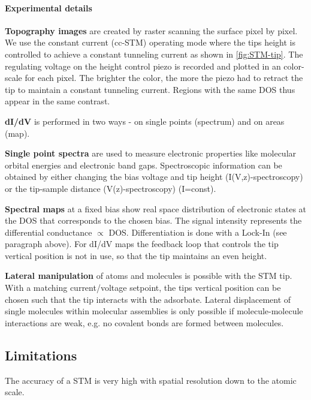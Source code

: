 \paragraph{Experimental details}

\textbf{Topography images} are created by raster scanning the surface pixel by pixel. 
We use the constant current (cc-STM) operating mode where the tips height is controlled to achieve a constant tunneling current as shown in \autoref{fig:STM-tip}. The regulating voltage on the height control piezo is recorded and plotted in an color-scale for each pixel. The brighter the color, the more the piezo had to retract the tip to maintain a constant tunneling current. Regions with the same DOS thus appear in the same contrast.


\textbf{dI/dV} is performed in two ways - on single points (spectrum) and on areas (map). 

\textbf{Single point spectra} are used to measure electronic properties like molecular orbital energies and electronic band gaps.
Spectroscopic information can be obtained by either changing the bias voltage and tip height (I(V,z)-spectroscopy) or the tip-sample distance (V(z)-spectroscopy) (I=const).   

\textbf{Spectral maps} at a fixed bias show real space distribution of electronic states at the DOS that corresponds to the chosen bias. The signal intensity represents the differential conductance $\propto$ DOS. Differentiation is done with a Lock-In (see paragraph above). For dI/dV maps the feedback loop that controls the tip vertical position is not in use, so that the tip maintains an even height.

\textbf{Lateral manipulation} of atoms and molecules is possible with the STM tip. With a matching current/voltage setpoint, the tips vertical position can be chosen such that the tip interacts with the adsorbate. Lateral displacement of single molecules within molecular assemblies is only possible if molecule-molecule interactions are weak, e.g. no covalent bonds are formed between molecules. 

\subsection{Limitations}

The accuracy of a STM is very high with spatial resolution down to the atomic scale.

